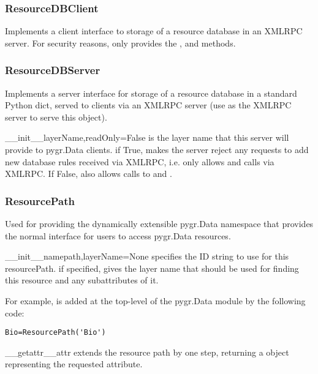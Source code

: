 \documentclass{howto}
\begin{document}
\subsubsection{ResourceDBClient}
Implements a client interface to storage of a resource database in an XMLRPC
server.  For security reasons, only provides the ,
and  methods.

\subsubsection{ResourceDBServer}
Implements a server interface for storage of a resource database in 
a standard Python dict, served to clients via an XMLRPC
server (use  as the XMLRPC
server to serve this object).  

\begin{funcdesc}{__init__}{layerName,readOnly=False}
   is the layer name that this server will provide
  to pygr.Data clients.   if True, makes the server reject
  any requests to add new database rules received via XMLRPC, i.e.
  only allows  and  calls via XMLRPC.
  If False, also allows calls to  and .
\end{funcdesc}

\subsubsection{ResourcePath}
Used for providing the dynamically extensible pygr.Data namespace
that provides the normal interface for users to access pygr.Data resources.
\begin{funcdesc}{__init__}{namepath,layerName=None}
   specifies the ID string to use for this resourcePath.
   if specified, gives the layer name that should be used
  for finding this resource and any subattributes of it.

  For example,  is added at the top-level of the pygr.Data module
  by the following code:
\begin{verbatim}
Bio=ResourcePath('Bio')
\end{verbatim}
\end{funcdesc}

\begin{funcdesc}{__getattr__}{attr}
  extends the resource path by one step, returning a
   object representing the requested attribute.
\end{funcdesc}
\end{document}
